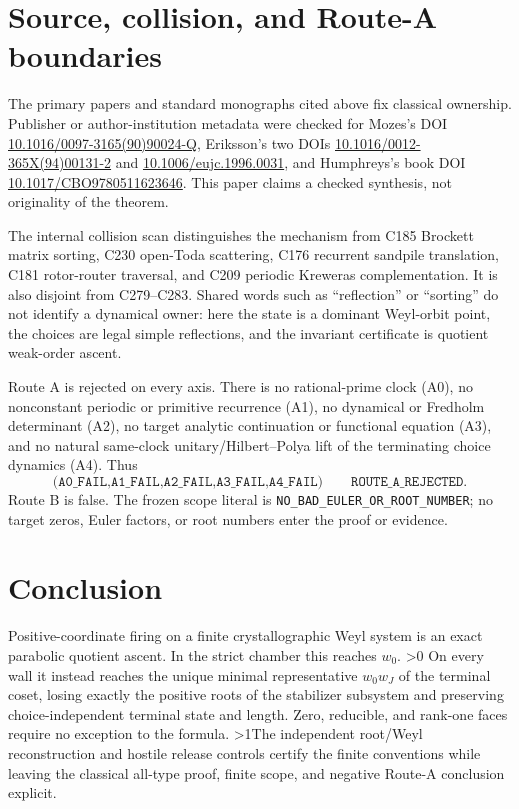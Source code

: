 \documentclass[10pt]{article}
\providecommand{\CRevisionRound}{2}
\begin{document}
\section{Source, collision, and Route-A boundaries}

The primary papers and standard monographs cited above fix classical
ownership.  Publisher or author-institution metadata were checked for
Mozes's DOI \href{https://doi.org/10.1016/0097-3165(90)90024-Q}
{10.1016/0097-3165(90)90024-Q}, Eriksson's two DOIs
\href{https://doi.org/10.1016/0012-365X(94)00131-2}
{10.1016/0012-365X(94)00131-2} and
\href{https://doi.org/10.1006/eujc.1996.0031}
{10.1006/eujc.1996.0031}, and Humphreys's book DOI
\href{https://doi.org/10.1017/CBO9780511623646}
{10.1017/CBO9780511623646}.  This paper claims a checked synthesis, not
originality of the theorem.

The internal collision scan distinguishes the mechanism from C185 Brockett
matrix sorting, C230 open-Toda scattering, C176 recurrent sandpile
translation, C181 rotor-router traversal, and C209 periodic Kreweras
complementation.  It is also disjoint from C279--C283.  Shared words such as
``reflection'' or ``sorting'' do not identify a dynamical owner: here the
state is a dominant Weyl-orbit point, the choices are legal simple
reflections, and the invariant certificate is quotient weak-order ascent.

Route A is rejected on every axis.  There is no rational-prime clock (A0), no
nonconstant periodic or primitive recurrence (A1), no dynamical or Fredholm
determinant (A2), no target analytic continuation or functional equation
(A3), and no natural same-clock unitary/Hilbert--Polya lift of the terminating
choice dynamics (A4).  Thus
\begin{equation}
 \texttt{(A0\_FAIL,A1\_FAIL,A2\_FAIL,A3\_FAIL,A4\_FAIL)}
 \qquad \texttt{ROUTE\_A\_REJECTED}.                     \tag{11}
\end{equation}
Route B is false.  The frozen scope literal is
\texttt{NO\_BAD\_EULER\_OR\_ROOT\_NUMBER}; no target zeros, Euler factors,
or root numbers enter the proof or evidence.
\fi

\section*{Conclusion}

Positive-coordinate firing on a finite crystallographic Weyl system is an
exact parabolic quotient ascent.  In the strict chamber this reaches $w_0$.
\ifnum\CRevisionRound>0 On every wall it instead reaches the unique minimal
representative $w_0w_J$ of the terminal coset, losing exactly the positive
roots of the stabilizer subsystem and preserving choice-independent terminal
state and length.  Zero, reducible, and rank-one faces require no exception to
the formula.\fi
\ifnum\CRevisionRound>1\relax\space The independent root/Weyl reconstruction and hostile
release controls certify the finite conventions while leaving the classical
all-type proof, finite scope, and negative Route-A conclusion explicit.\fi
\end{document}
